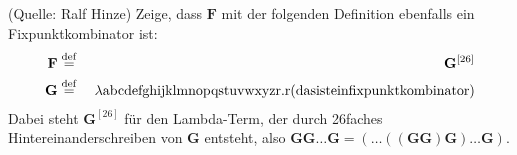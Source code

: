 \begin{aufgabe} (Quelle: Ralf Hinze)
  Zeige, dass $\mathbf{F}$ mit der folgenden Definition ebenfalls ein
  Fixpunktkombinator ist:
  \begin{eqnarray*}
    \mathbf{F} &\stackrel{\rm def}{=}{}& \mathbf{G}^{[26]}
    \\
    \mathbf{G} &\stackrel{\rm def}{=}{}& \lambda \mathrm a\mathrm b\mathrm c\mathrm d\mathrm e\mathrm f\mathrm g\mathrm h\mathrm i\mathrm j\mathrm k\mathrm l\mathrm m\mathrm n\mathrm o\mathrm p\mathrm q\mathrm s\mathrm t\mathrm u\mathrm v\mathrm w\mathrm x\mathrm y\mathrm z\mathrm r.\mathrm r(\mathrm d\mathrm a\mathrm s\mathrm i\mathrm s\mathrm t\mathrm e\mathrm i\mathrm n\mathrm f\mathrm i\mathrm x\mathrm p\mathrm u\mathrm n\mathrm k\mathrm t\mathrm k\mathrm o\mathrm m\mathrm b\mathrm i\mathrm n\mathrm a\mathrm t\mathrm o\mathrm r)
  \end{eqnarray*}
  Dabei steht $\mathbf{G}^{[26]}$ für den Lambda-Term, der durch 26faches
  Hintereinanderschreiben von $\mathbf{G}$ entsteht, also $\mathbf{G}\mathbf{G}\ldots \mathbf{G} = (\ldots
  ((\mathbf{G} \mathbf{G}) \mathbf{G})\ldots \mathbf{G})$.
  

\end{aufgabe}

